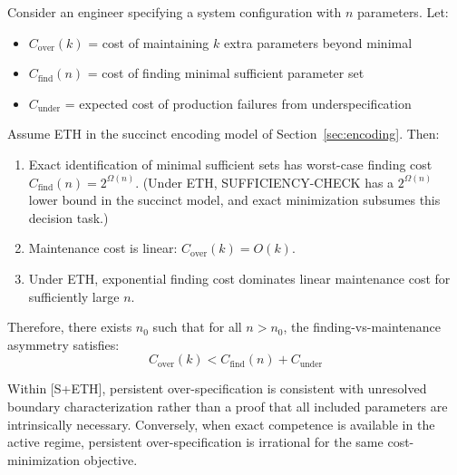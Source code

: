 \begin{theorem}
\label{thm:cost-asymmetry-eth}
Consider an engineer specifying a system configuration with $n$ parameters. Let:
\begin{itemize}
\item $C_{\text{over}}(k)$ = cost of maintaining $k$ extra parameters beyond minimal
\item $C_{\text{find}}(n)$ = cost of finding minimal sufficient parameter set
\item $C_{\text{under}}$ = expected cost of production failures from underspecification
\end{itemize}

Assume ETH in the succinct encoding model of Section~\ref{sec:encoding}. Then:
\begin{enumerate}
\item Exact identification of minimal sufficient sets has worst-case finding cost $C_{\text{find}}(n)=2^{\Omega(n)}$. (Under ETH, SUFFICIENCY-CHECK has a $2^{\Omega(n)}$ lower bound in the succinct model, and exact minimization subsumes this decision task.)
\item Maintenance cost is linear: $C_{\text{over}}(k) = O(k)$.
\item Under ETH, exponential finding cost dominates linear maintenance cost for sufficiently large $n$.
\end{enumerate}

Therefore, there exists $n_0$ such that for all $n > n_0$, the finding-vs-maintenance asymmetry satisfies:
\[
C_{\text{over}}(k) < C_{\text{find}}(n) + C_{\text{under}}
\]

Within [S+ETH], persistent over-specification is consistent with unresolved boundary characterization rather than a proof that all included parameters are intrinsically necessary. Conversely, when exact competence is available in the active regime, persistent over-specification is irrational for the same cost-minimization objective.
\end{theorem}

